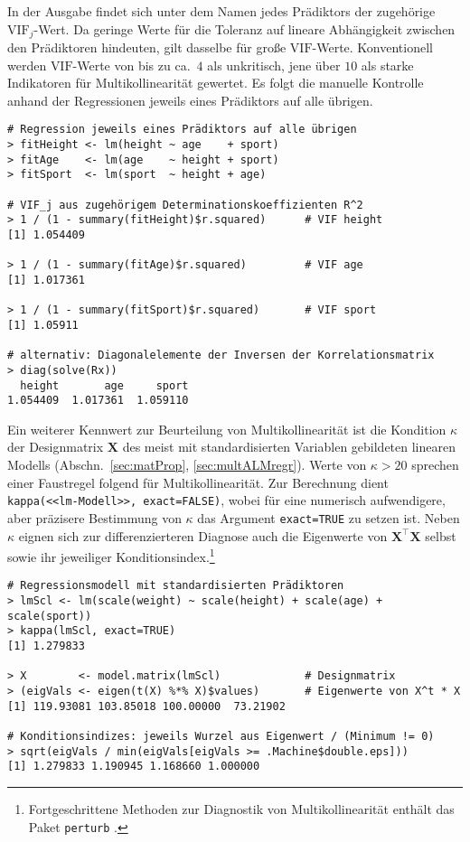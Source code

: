 In der Ausgabe findet sich unter dem Namen jedes Prädiktors der zugehörige $\text{VIF}_{j}$-Wert. Da geringe Werte für die Toleranz auf lineare Abhängigkeit zwischen den Prädiktoren hindeuten, gilt dasselbe für große $\text{VIF}$-Werte. Konventionell werden $\text{VIF}$-Werte von bis zu ca.\ $4$ als unkritisch, jene über $10$ als starke Indikatoren für Multikollinearität gewertet. Es folgt die manuelle Kontrolle anhand der Regressionen jeweils eines Prädiktors auf alle übrigen.
\begin{lstlisting}
# Regression jeweils eines Prädiktors auf alle übrigen
> fitHeight <- lm(height ~ age    + sport)
> fitAge    <- lm(age    ~ height + sport)
> fitSport  <- lm(sport  ~ height + age)

# VIF_j aus zugehörigem Determinationskoeffizienten R^2
> 1 / (1 - summary(fitHeight)$r.squared)      # VIF height
[1] 1.054409

> 1 / (1 - summary(fitAge)$r.squared)         # VIF age
[1] 1.017361

> 1 / (1 - summary(fitSport)$r.squared)       # VIF sport
[1] 1.05911

# alternativ: Diagonalelemente der Inversen der Korrelationsmatrix
> diag(solve(Rx))
  height       age     sport
1.054409  1.017361  1.059110
\end{lstlisting}

Ein weiterer Kennwert zur Beurteilung von Multikollinearität ist die Kondition $\kappa$ der Designmatrix $\bm{X}$ des meist mit standardisierten Variablen gebildeten linearen Modells (Abschn.\ \ref{sec:matProp}, \ref{sec:multALMregr}). Werte von $\kappa > 20$ sprechen einer Faustregel folgend für Multikollinearität. Zur Berechnung dient \lstinline!kappa(<<lm-Modell>>, exact=FALSE)!, wobei für eine numerisch aufwendigere, aber präzisere Bestimmung von $\kappa$ das Argument \lstinline!exact=TRUE! zu setzen ist. Neben $\kappa$ eignen sich zur differenzierteren Diagnose auch die Eigenwerte von $\bm{X}^{\top} \bm{X}$ selbst sowie ihr jeweiliger Konditionsindex.\footnote{Fortgeschrittene Methoden zur Diagnostik von Multikollinearität enthält das Paket \lstinline!perturb! \cite{Hendrickx2008}.}
\begin{lstlisting}
# Regressionsmodell mit standardisierten Prädiktoren
> lmScl <- lm(scale(weight) ~ scale(height) + scale(age) + scale(sport))
> kappa(lmScl, exact=TRUE)
[1] 1.279833

> X        <- model.matrix(lmScl)             # Designmatrix
> (eigVals <- eigen(t(X) %*% X)$values)       # Eigenwerte von X^t * X
[1] 119.93081 103.85018 100.00000  73.21902

# Konditionsindizes: jeweils Wurzel aus Eigenwert / (Minimum != 0)
> sqrt(eigVals / min(eigVals[eigVals >= .Machine$double.eps]))
[1] 1.279833 1.190945 1.168660 1.000000
\end{lstlisting}

